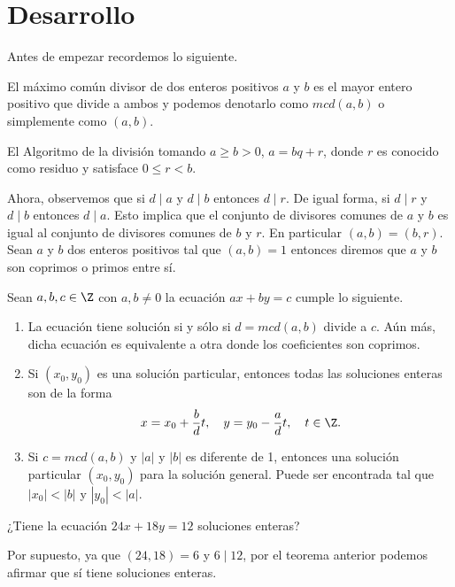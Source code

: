 \section{Desarrollo}
Antes de empezar recordemos lo siguiente.

\begin{definition.box}{El máximo común divisor}{}
    de dos enteros positivos $a$ y $b$ es el mayor entero positivo que divide a ambos y podemos denotarlo como $mcd(a,b)$ o simplemente como $(a,b)$.
\end{definition.box}

\begin{definition.box}{El Algoritmo de la división}{}
    tomando $a\geq b>0$, $a = bq+r$, donde $r$ es conocido como residuo y satisface $0\leq r <b$.
\end{definition.box}

Ahora, observemos que si $d \mid a$ y $d\mid b$ entonces $d\mid r$.
De igual forma, si $d \mid r$ y $d \mid b$ entonces $d\mid a$.
Esto implica que el conjunto de divisores comunes de $a$ y $b$ es igual al conjunto de divisores comunes de $b$ y $r$.
En particular $(a,b)=(b,r).$
Sean $a$ y $b$ dos enteros positivos tal que $(a,b) = 1$ entonces diremos que $a$ y $b$ son coprimos o primos entre sí.

\begin{theorem.box}{}{} \label{tLinearEquation}
Sean $a,b,c \in \Z$ con $a,b \neq 0$ la ecuación $ax + by = c$ cumple lo siguiente.
\begin{enumerate}
    \item La ecuación tiene solución si y sólo si $d = mcd(a,b)$ divide a $c$.
    Aún más, dicha ecuación es equivalente a otra donde los coeficientes son coprimos.
    \item Si $(x_0,y_0)$ es una solución particular, entonces todas las soluciones enteras son de la forma
    \[
        x = x_0+\frac{b}{d}t, \quad y = y_0 -\frac{a}{d}t, \quad t \in \Z.
    \]
    \item Si $c = mcd(a,b)$ y $|a|$ y $|b|$ es diferente de 1, entonces una solución particular $(x_0,y_0)$ para la solución general.
    Puede ser encontrada tal que $|x_0| < |b|$ y $|y_0| < |a|$.
\end{enumerate}
\end{theorem.box}

\begin{example}
    ¿Tiene la ecuación $24x+18y=12$ soluciones enteras?
\end{example}
\begin{solution}
    Por supuesto, ya que $(24,18) = 6$ y $6 \mid 12$, por el teorema anterior podemos afirmar que sí tiene soluciones enteras.
\end{solution}

